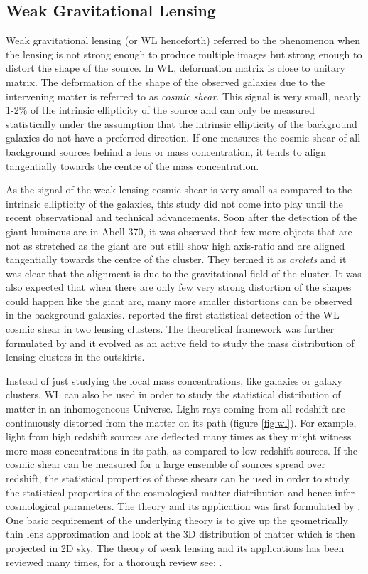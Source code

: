 \subsection{Weak Gravitational Lensing}\label{sec:wl}

Weak gravitational lensing (or WL henceforth) referred to the phenomenon when 
the lensing is not strong enough to produce multiple images but strong enough
to distort the shape of the source. In WL, deformation matrix is close
to unitary matrix.
The deformation of the shape of the observed galaxies
due to the intervening matter is referred to as {\it cosmic shear}. This
signal is very small, nearly 1-2$\%$ of the intrinsic ellipticity of the source 
and can only be measured statistically under the assumption that the intrinsic 
ellipticity of the background galaxies do not have a preferred direction. If one 
measures the cosmic shear of all background sources behind a lens or mass concentration,
it tends to align tangentially towards the centre of the mass concentration. 

As the signal of the weak lensing cosmic shear is very small as compared to the 
intrinsic ellipticity of the galaxies, this study did not come into play until
the recent observational and technical advancements. Soon 
after the detection of the giant luminous arc in Abell 370, it was observed
that few more objects that are not as stretched as the giant arc but still show
high axis-ratio and are aligned tangentially towards the centre of the cluster. They
termed it as {\it arclets} and it was clear that the alignment is due to the 
gravitational field of the cluster. It was also expected that when there are
only few very strong distortion of the shapes could happen like the giant 
arc, many more smaller distortions can be observed in the background galaxies.
\cite{1990ApJ...349L...1T} reported the first statistical detection of the WL
cosmic shear in two lensing clusters. The theoretical framework was further
formulated by \cite{1993ApJ...404..441K} and it evolved as an active field
to study the mass distribution of lensing clusters in the outskirts. 

Instead of just studying the local mass concentrations, like galaxies or galaxy
clusters, WL can also be used in order to study the statistical distribution of matter
in an inhomogeneous Universe. Light rays coming from all redshift are continuously
distorted from the matter on its path (figure \ref{fig:wl}). 
For example, light from high redshift sources
are deflected many times as they might witness more mass concentrations in its path, 
as compared to low redshift sources. If the cosmic shear can be measured for 
a large ensemble of sources spread over redshift, the statistical properties
of these shears can be used in order to study the statistical properties of the
cosmological matter distribution and hence infer cosmological parameters. The 
theory and its application was first formulated by \cite{1991MNRAS.251..600B}.
One basic requirement of the underlying theory is to give up the geometrically
thin lens approximation and look at the 3D distribution of matter which 
is then projected in 2D sky. The theory of weak lensing and its applications
has been reviewed many times, for a thorough review see: \cite{}.

